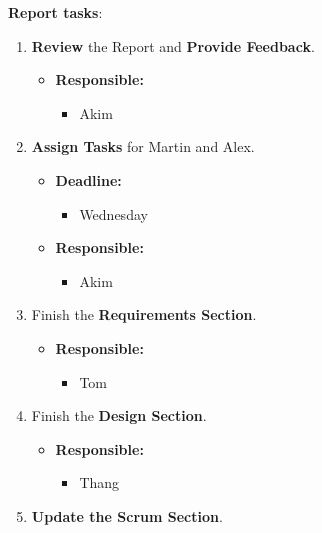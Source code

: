 \documentclass[12pt]{article}
\begin{document}
\textbf{Report tasks}:

\begin{enumerate}
\def\labelenumi{\arabic{enumi}.}
\setcounter{enumi}{5}
\tightlist
\item
  \textbf{Review} the Report and \textbf{Provide Feedback}.

  \begin{itemize}
  \tightlist
  \item
    \textbf{Responsible:}

    \begin{itemize}
    \tightlist
    \item
      Akim
    \end{itemize}
  \end{itemize}
\newpage
\item
  \textbf{Assign Tasks} for Martin and Alex.

  \begin{itemize}
  \tightlist
  \item
    \textbf{Deadline:}

    \begin{itemize}
    \tightlist
    \item
      Wednesday
    \end{itemize}
  \item
    \textbf{Responsible:}

    \begin{itemize}
    \tightlist
    \item
      Akim
    \end{itemize}
  \end{itemize}
\item
  Finish the \textbf{Requirements Section}.

  \begin{itemize}
  \tightlist
  \item
    \textbf{Responsible:}

    \begin{itemize}
    \tightlist
    \item
      Tom
    \end{itemize}
  \end{itemize}
\item
  Finish the \textbf{Design Section}.

  \begin{itemize}
  \tightlist
  \item
    \textbf{Responsible:}

    \begin{itemize}
    \tightlist
    \item
      Thang
    \end{itemize}
  \end{itemize}
\item
  \textbf{Update the Scrum Section}.


\end{enumerate}
\end{document}
